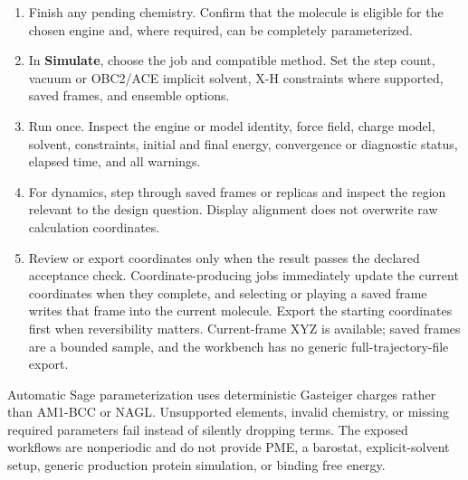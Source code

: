 \begin{enumerate}
\item Finish any pending chemistry. Confirm that the molecule is eligible for the chosen engine and, where required, can be completely parameterized.
\item In \textbf{Simulate}, choose the job and compatible method. Set the step count, vacuum or OBC2/ACE implicit solvent, X-H constraints where supported, saved frames, and ensemble options.
\item Run once. Inspect the engine or model identity, force field, charge model, solvent, constraints, initial and final energy, convergence or diagnostic status, elapsed time, and all warnings.
\item For dynamics, step through saved frames or replicas and inspect the region relevant to the design question. Display alignment does not overwrite raw calculation coordinates.
\item Review or export coordinates only when the result passes the declared acceptance check. Coordinate-producing jobs immediately update the current coordinates when they complete, and selecting or playing a saved frame writes that frame into the current molecule. Export the starting coordinates first when reversibility matters. Current-frame XYZ is available; saved frames are a bounded sample, and the workbench has no generic full-trajectory-file export.
\end{enumerate}


Automatic Sage parameterization uses deterministic Gasteiger charges rather than AM1-BCC or NAGL. Unsupported elements, invalid chemistry, or missing required parameters fail instead of silently dropping terms. The exposed workflows are nonperiodic and do not provide PME, a barostat, explicit-solvent setup, generic production protein simulation, or binding free energy.

